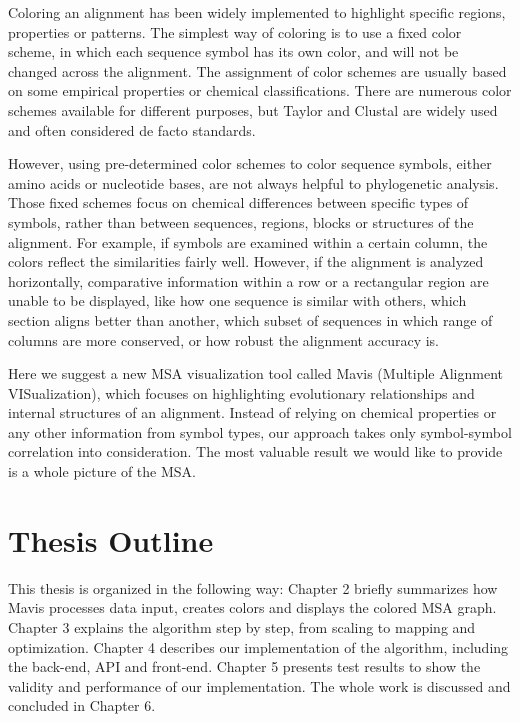 Coloring an alignment has been widely implemented to highlight specific regions, properties or patterns. \cite{Procter2010aa} The simplest way of coloring is to use a fixed color scheme, in which each sequence symbol has its own color, and will not be changed across the alignment. The assignment of color schemes are usually based on some empirical properties or chemical classifications. There are numerous color schemes available for different purposes, but Taylor \cite{LIN2002361} and Clustal \cite{Thompsonaa} are widely used and often considered de facto standards.

However, using pre-determined color schemes to color sequence symbols, either amino acids or nucleotide bases, are not always helpful to phylogenetic analysis. Those fixed schemes focus on chemical differences between specific types of symbols, rather than between sequences, regions, blocks or structures of the alignment. For example, if symbols are examined within a certain column, the colors reflect the similarities fairly well. However, if the alignment is analyzed horizontally, comparative information within a row or a rectangular region are unable to be displayed, like how one sequence is similar with others, which section aligns better than another, which subset of sequences in which range of columns are more conserved, or how robust the alignment accuracy is.

Here we suggest a new MSA visualization tool called Mavis (Multiple Alignment VISualization), which focuses on highlighting evolutionary relationships and internal structures of an alignment. Instead of relying on chemical properties or any other information from symbol types, our approach takes only symbol-symbol correlation into consideration. The most valuable result we would like to provide is a whole picture of the MSA.

\section{Thesis Outline}

This thesis is organized in the following way: Chapter 2 briefly summarizes how Mavis processes data input, creates colors and displays the colored MSA graph. Chapter 3 explains the algorithm step by step, from scaling to mapping and optimization. Chapter 4 describes our implementation of the algorithm, including the back-end, API and front-end. Chapter 5 presents test results to show the validity and performance of our implementation. The whole work is discussed and concluded in Chapter 6.